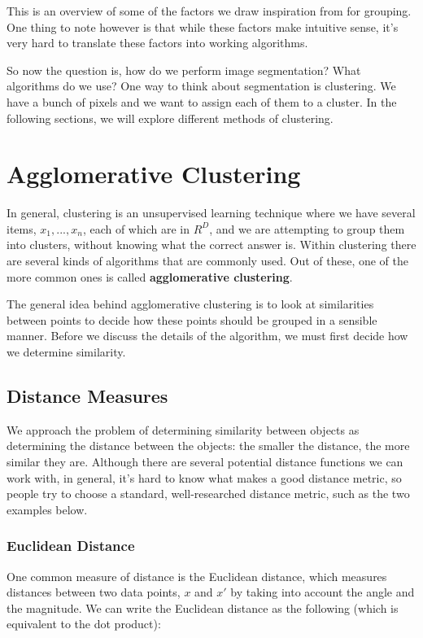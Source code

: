 \documentclass{article}
\begin{document}
This is an overview of some of the factors we draw inspiration from for grouping. One thing to note however is that while these factors make intuitive sense, it's very hard to translate these factors into working algorithms.

So now the question is, how do we perform image segmentation? What algorithms do we use? One way to think about segmentation is clustering. We have a bunch of pixels and we want to assign each of them to a cluster. In the following sections, we will explore different methods of clustering.

\section{Agglomerative Clustering}

In general, clustering is an unsupervised learning technique where we have several items, $x_1, ..., x_n$, each of which are in $R^D$, and we are attempting to group them into clusters, without knowing what the correct answer is. Within clustering there are several kinds of algorithms that are commonly used. Out of these, one of the more common ones is called \textbf{agglomerative clustering}. 

The general idea behind agglomerative clustering is to look at similarities between points to decide how these points should be grouped in a sensible manner. Before we discuss the details of the algorithm, we must first decide how we determine similarity.

\subsection{Distance Measures}

We approach the problem of determining similarity between objects as determining the distance between the objects: the smaller the distance, the more similar they are. Although there are several potential distance functions we can work with, in general, it's hard to know what makes a good distance metric, so people try to choose a standard, well-researched distance metric, such as the two examples below.

\subsubsection{Euclidean Distance}

One common measure of distance is the Euclidean distance, which measures distances between two data points, $x$ and $x'$ by taking into account the angle and the magnitude. We can write the Euclidean distance as the following (which is equivalent to the dot product):
\end{document}
